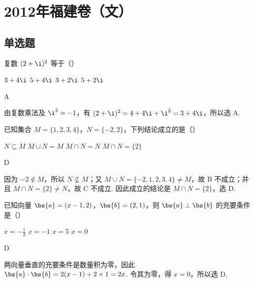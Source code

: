 \chapter{2012年福建卷（文）}

\section{单选题}

\begin{problem}
复数 \((2 + \i)^2\) 等于（\quad）

\choices
    {\(3 + 4\i\)}
    {\(5 + 4\i\)}
    {\(3 + 2\i\)}
    {\(5 + 2\i\)}
\end{problem}

\begin{answer}
A
\end{answer}

\begin{solution}
由复数乘法及 \(\i^2=-1\)，有 \((2+\i)^2=4+4\i+\i^2=3+4\i\)，所以选 A.
\end{solution}

\begin{problem}
已知集合 \(M = \{1, 2, 3, 4\}\)，\(N = \{-2, 2\}\)，下列结论成立的是（\quad）

\choices
    {\(N \subseteq M\)}
    {\(M \cup N = M\)}
    {\(M \cap N = N\)}
    {\(M \cap N = \{2\}\)}
\end{problem}

\begin{answer}
D
\end{answer}

\begin{solution}
因为 \(-2\notin M\)，所以 \(N\not\subseteq M\)；又 \(M\cup N=\{-2,1,2,3,4\}\ne M\)，故 B 不成立；并且 \(M\cap N=\{2\}\ne N\)，故 C 不成立. 因此成立的结论是 \(M\cap N=\{2\}\)，选 D.
\end{solution}

\begin{problem}
已知向量 \(\bs{a} = (x - 1, 2)\)，\(\bs{b} = (2, 1)\)，则 \(\bs{a} \perp \bs{b}\) 的充要条件是（\quad）

\choices
    {\(x = -\frac{1}{2}\)}
    {\(x = -1\)}
    {\(x = 5\)}
    {\(x = 0\)}
\end{problem}

\begin{answer}
D
\end{answer}

\begin{solution}
两向量垂直的充要条件是数量积为零，因此 \(\bs{a}\cdot\bs{b}=2(x-1)+2\times1=2x\). 令其为零，得 \(x=0\)，所以选 D.
\end{solution}

